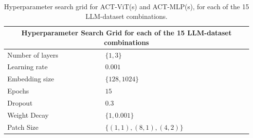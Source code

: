 \begin{table}[t]
\centering
\caption{Hyperparameter search grid for ACT-ViT(s) and ACT-MLP(s), for each of the 15 LLM-dataset
combinations.}
\label{tab:hp_single}
\renewcommand{\arraystretch}{1.15}
\begin{tabular}{|l|l|}
\hline
\multicolumn{2}{|c|}{\textbf{Hyperparameter Search Grid for each of the 15 LLM-dataset combinations}} \\
\hline
Number of layers & $\{1, 3\}$ \\
\hline
Learning rate    & $0.001$ \\
\hline
Embedding size   & $\{128, 1024\}$ \\
\hline
Epochs           & $15$ \\
\hline
Dropout          & $0.3$ \\
\hline
Weight Decay     & $\{1, 0.001\}$ \\
\hline
Patch Size       & $\{(1, 1), (8, 1), (4, 2)\}$ \\
\hline
\end{tabular}
\end{table}
